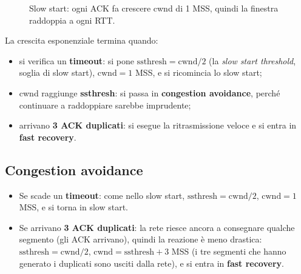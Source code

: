 \begin{figure}[H]
\centering
{}
\caption{Slow start: ogni ACK fa crescere cwnd di 1 MSS, quindi la finestra raddoppia a ogni RTT.}
\end{figure}

La crescita esponenziale termina quando:

\begin{itemize}
    \item si verifica un \textbf{timeout}: si pone $\text{ssthresh} = \text{cwnd}/2$ (la \emph{slow start threshold},
          soglia di slow start), $\text{cwnd} = 1$ MSS, e si ricomincia lo slow start;
    \item cwnd raggiunge \textbf{ssthresh}: si passa in \textbf{congestion avoidance}, perché continuare a raddoppiare
          sarebbe imprudente;
    \item arrivano \textbf{3 ACK duplicati}: si esegue la ritrasmissione veloce e si entra in \textbf{fast recovery}.
\end{itemize}

\subsection{Congestion avoidance}


\begin{itemize}
    \item Se scade un \textbf{timeout}: come nello slow start, $\text{ssthresh} = \text{cwnd}/2$, $\text{cwnd} = 1$ MSS, e si torna in slow start.
    \item Se arrivano \textbf{3 ACK duplicati}: la rete riesce ancora a consegnare qualche segmento (gli ACK arrivano),
          quindi la reazione è meno drastica: $\text{ssthresh} = \text{cwnd}/2$, $\text{cwnd} = \text{ssthresh} + 3$ MSS
          (i tre segmenti che hanno generato i duplicati sono usciti dalla rete), e si entra in \textbf{fast recovery}.
\end{itemize}

